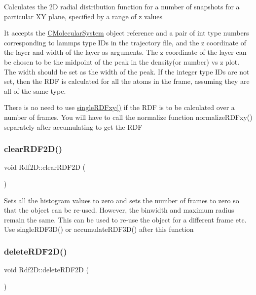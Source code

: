 Calculates the 2D radial distribution function for a number of snapshots for a particular XY plane, specified by a range of z values

It accepts the \mbox{\hyperlink{classCMolecularSystem}{C\+Molecular\+System}} object reference and a pair of int type numbers corresponding to lammps type I\+Ds in the trajectory file, and the z coordinate of the layer and width of the layer as arguments. The z coordinate of the layer can be chosen to be the midpoint of the peak in the density(or number) vs z plot. The width should be set as the width of the peak. If the integer type I\+Ds are not set, then the R\+DF is calculated for all the atoms in the frame, assuming they are all of the same type.

There is no need to use \mbox{\hyperlink{classRdf2D_afc5ff73aa9c126184e94ee3abfc14ff4}{single\+R\+D\+Fxy()}} if the R\+DF is to be calculated over a number of frames. You will have to call the normalize function normalize\+R\+D\+Fxy() separately after accumulating to get the R\+DF \mbox{\label{classRdf2D_a9658a9bb2229afda0d743bdc05a27411}} 
\subsubsection{\texorpdfstring{clear\+R\+D\+F2\+D()}{clearRDF2D()}}
{\footnotesize\ttfamily void Rdf2\+D\+::clear\+R\+D\+F2D (\begin{DoxyParamCaption}{ }\end{DoxyParamCaption})}

Sets all the histogram values to zero and sets the number of frames to zero so that the object can be re-\/used. However, the binwidth and maximum radius remain the same. This can be used to re-\/use the object for a different frame etc. Use single\+R\+D\+F3\+D() or accumulate\+R\+D\+F3\+D() after this function \mbox{\label{classRdf2D_a8008421c8aedff5887160b455879d36b}} 
\subsubsection{\texorpdfstring{delete\+R\+D\+F2\+D()}{deleteRDF2D()}}
{\footnotesize\ttfamily void Rdf2\+D\+::delete\+R\+D\+F2D (\begin{DoxyParamCaption}{ }\end{DoxyParamCaption})}

